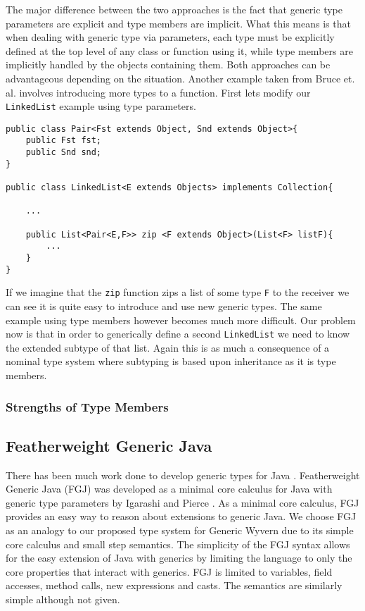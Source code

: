 \documentclass[11pt
              , a4paper
              , twoside
              , openright
              ]{report}
\numberwithin{case}{theorem}
\numberwithin{subcase}{case}
\begin{document}
The major difference between the two approaches is the fact that generic type parameters are explicit and type members are implicit. What this means is that when dealing with generic type via parameters, each type must be explicitly defined at the top level of any class or function using it, while type members are implicitly handled by the objects containing them. Both approaches can be advantageous depending on the situation. Another example taken from Bruce et. al. \cite{Bruce:1998:SSA:646155.679691} involves introducing more types to a function. First lets modify our \verb|LinkedList| example using type parameters.
\begin{lstlisting}[mathescape, style=custom_lang]
public class Pair<Fst extends Object, Snd extends Object>{
	public Fst fst;
	public Snd snd;
}

public class LinkedList<E extends Objects> implements Collection{

	...
	
	public List<Pair<E,F>> zip <F extends Object>(List<F> listF){
		...
	}	
}
\end{lstlisting}
If we imagine that the \verb|zip| function zips a list of some type \verb|F| to the receiver we can see it is quite easy to introduce and use new generic types. The same example using type members however becomes much more difficult. Our problem now is that in order to generically define a second \verb|LinkedList| we need to know the extended subtype of that list. Again this is as much a consequence of a nominal type system where subtyping is based upon inheritance as it is type members. 

\subsubsection{Strengths of Type Members}



\subsection{Featherweight Generic Java}
There has been much work done to develop generic types for Java \cite{agesen1997adding, Bracha:1998:MFS:286936.286957, Cartwright:1998:CGR:286936.286958, Odersky:1997:PJT:263699.263715, Bank:1997:PTJ:263699.263714}. Featherweight Generic Java (FGJ) was developed as a minimal core calculus for Java with generic type parameters by Igarashi and Pierce \cite{Igarashi:2001:FJM:503502.503505}. As a minimal core calculus, FGJ provides an easy way to reason about extensions to generic Java. We choose FGJ as an analogy to our proposed type system for Generic Wyvern due to its simple core calculus and small step semantics.
The simplicity of the FGJ syntax allows for the easy extension of Java with generics \cite{Potanin:2006:GOG:1167473.1167500, Zibin:2010:OIG:1932682.1869509} by limiting the language to only the core properties that interact with generics. FGJ is limited to variables, field accesses, method calls, new expressions and casts. The semantics are similarly simple although not given. 
\end{document}
